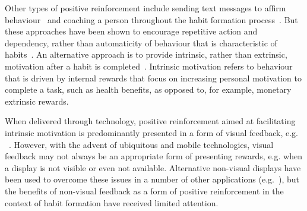 \documentclass{scaffold/sigchi}
\begin{document}
%

Other types of positive reinforcement include sending text messages to affirm behaviour~\cite{chi_crowd_designed_motivation} and coaching a person throughout the habit formation process~\cite{coaching_not_that_good}. But these approaches have been shown to encourage repetitive action and dependency, rather than automaticity of behaviour that is characteristic of habits~\cite{habits_as_automaticity_not_frequency_gardner}.
%
An alternative approach is to provide intrinsic, rather than extrinsic, motivation after a habit is completed~\cite{article_a_self_efficacy, article_meta_analytic_review_intrinsic_motivation}. Intrinsic motivation refers to behaviour that is driven by internal rewards that focus on increasing personal motivation to complete a task, such as health benefits, as opposed to, for example, monetary extrinsic rewards.

When delivered through technology, positive reinforcement aimed at facilitating intrinsic motivation is predominantly presented in a form of visual feedback, e.g. %
~\cite{comparison_of_auditory_visual_feedback, visual_mode_better, article_realtime_feedback_improving_medication_taking}. 
%
However, with the advent of ubiquitous and mobile technologies, visual feedback may not always be an appropriate form of presenting rewards, e.g. when a display is not visible or even not available.  Alternative non-visual displays have been used to overcome these issues in a number of other applications (e.g.~\cite{burke2006comparing, vazquez2012auditory, chi_oussama_tap_the_shapetones}), 
but the benefits of non-visual feedback as a form of positive reinforcement in the context of habit formation have received limited attention.


%
%
\end{document}
